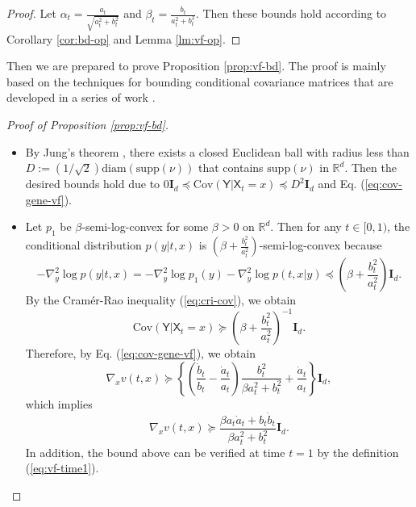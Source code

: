\documentclass[twoside,11pt]{article}
\def\rmI{{\mathbf{I}}}
\def\sR{{\mathbb{R}}}
\newcommand{\Cov}{\mathrm{Cov}}
\def\paref#1{(\ref{#1})}
\numberwithin{equation}{section}
\begin{document}
\begin{proof}
    Let $\alpha_t = \frac{a_t}{\sqrt{a_t^2 + b_t^2}}$ and $\beta_t = \frac{b_t}{a_t^2 + b_t^2}$. Then these bounds hold according to Corollary \ref{cor:bd-op} and Lemma \ref{lm:vf-op}.
\end{proof}


Then we are prepared to prove Proposition \ref{prop:vf-bd}. The proof is mainly based on the techniques for bounding conditional covariance matrices that are developed in a series of work \citep{wibisono2018convexity-heat, wibisono2018convexity-ou, mikulincer2021brownian, mikulincer2023lipschitz, chewi2022entropic, dai2023lipschitz}.

\begin{proof} [Proof of Proposition \ref{prop:vf-bd}]
\begin{itemize}
\item[(a)] By Jung's theorem \citep[Theorem 2.6]{danzer1963helly}, there exists a closed Euclidean ball with radius less than $D := (1/\sqrt{2} ) \mathrm{diam} (\mathrm{supp}(\nu))$ that contains $\mathrm{supp}(\nu)$ in $\sR^d$.
Then the desired bounds hold due to $0 \rmI_d \preceq \Cov (\mathsf{Y} | \mathsf{X}_t = x) \preceq D^2 \rmI_d$ and Eq. \paref{eq:cov-gene-vf}.

\item[(b)] Let $p_1$ be $\beta$-semi-log-convex for some $\beta >0$ on $\sR^d$. Then for any $t\in [0,1)$, the conditional distribution $p(y | t, x)$ is $\left(\beta + \frac{b_t^2}{a_t^2} \right)$-semi-log-convex because
\begin{equation*}
    -\nabla^2_y \log p(y | t, x)
    = -\nabla^2_y \log p_1(y) - \nabla^2_y \log p(t, x | y)
    \preceq \left( \beta + \frac{b_t^2}{a_t^2} \right) \rmI_d.
\end{equation*}
By the Cram{\'e}r-Rao inequality \paref{eq:cri-cov}, we obtain
\begin{equation*}
    \Cov (\mathsf{Y} | \mathsf{X}_t = x) \succeq \left(\beta + \frac{b_t^2}{a_t^2} \right)^{-1} \rmI_d.
\end{equation*}
Therefore, by Eq. \paref{eq:cov-gene-vf}, we obtain
\begin{equation*}
    \nabla_x v(t, x) \succeq \left\{ \left( \frac{\dot{b}_t}{b_t} - \frac{\dot{a}_t}{a_t} \right) \frac{b_t^2}{\beta a_t^2 + b_t^2} + \frac{\dot{a}_t} {a_t} \right\} \rmI_d,
\end{equation*}
which implies
\begin{equation*}
    \nabla_x v(t, x) \succeq \frac{\beta a_t \dot{a}_t + b_t \dot{b}_t} {\beta a_t^2 + b_t^2} \rmI_d.
\end{equation*}
In addition, the bound above can be verified at time $t = 1$ by the definition \paref{eq:vf-time1}.


\end{itemize}
\end{proof}
\end{document}
